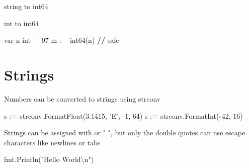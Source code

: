\documentclass[]{book}
\newenvironment{Shaded}{\begin{snugshade}}{\end{snugshade}}
\newcommand{\BuiltInTok}[1]{#1}
\newcommand{\CharTok}[1]{\textcolor[rgb]{0.31,0.60,0.02}{#1}}
\newcommand{\ControlFlowTok}[1]{\textcolor[rgb]{0.13,0.29,0.53}{\textbf{#1}}}
\newcommand{\DecValTok}[1]{\textcolor[rgb]{0.00,0.00,0.81}{#1}}
\newcommand{\FloatTok}[1]{\textcolor[rgb]{0.00,0.00,0.81}{#1}}
\newcommand{\NormalTok}[1]{#1}
\newcommand{\OperatorTok}[1]{\textcolor[rgb]{0.81,0.36,0.00}{\textbf{#1}}}
\newcommand{\SpecialCharTok}[1]{\textcolor[rgb]{0.00,0.00,0.00}{#1}}
\newcommand{\StringTok}[1]{\textcolor[rgb]{0.31,0.60,0.02}{#1}}
\begin{document}
string to int64

\begin{Shaded}
\end{Shaded}

int to int64

\begin{Shaded}
\begin{Highlighting}[]
\NormalTok{var n }\BuiltInTok{int} \OperatorTok{=} \DecValTok{97}
\NormalTok{m :}\OperatorTok{=}\NormalTok{ int64(n) }\OperatorTok{//}\NormalTok{ safe}
\end{Highlighting}
\end{Shaded}

\hypertarget{strings}{%
\section{Strings}\label{strings}}

Numbers can be converted to strings using strconv

\begin{Shaded}
\begin{Highlighting}[]
\NormalTok{s :}\OperatorTok{=}\NormalTok{ strconv.FormatFloat(}\FloatTok{3.1415}\NormalTok{, }\StringTok{'E'}\NormalTok{, }\DecValTok{-1}\NormalTok{, }\DecValTok{64}\NormalTok{)}
\NormalTok{s :}\OperatorTok{=}\NormalTok{ strconv.FormatInt(}\OperatorTok{-}\DecValTok{42}\NormalTok{, }\DecValTok{16}\NormalTok{)}
\end{Highlighting}
\end{Shaded}

Strings can be assigned with \texttt{} or " ", but only the double quotes can use escape characters like newlines or tabs

\begin{Shaded}
\begin{Highlighting}[]
\NormalTok{fmt.Println(}\StringTok{"Hello World}\CharTok{\textbackslash{}n}\StringTok{"}\NormalTok{)}
\end{Highlighting}
\end{Shaded}
\end{document}

